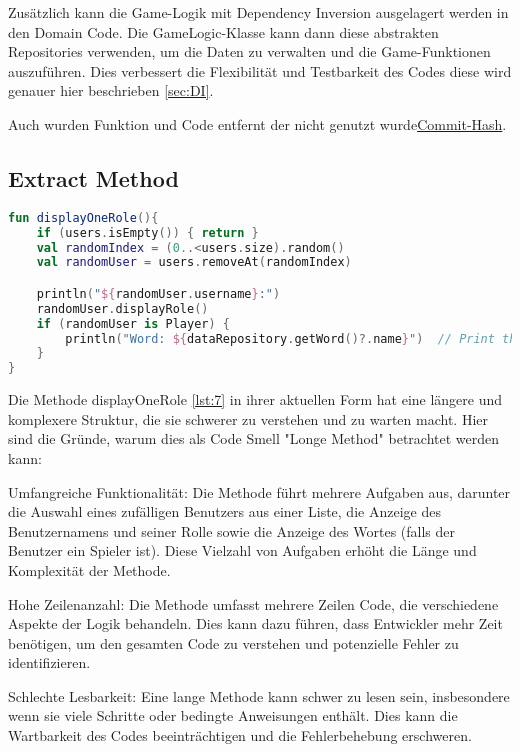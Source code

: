 Zusätzlich kann die Game-Logik mit Dependency Inversion ausgelagert werden in den Domain Code. Die GameLogic-Klasse kann dann diese abstrakten Repositories verwenden, um die Daten zu verwalten und die Game-Funktionen auszuführen. Dies verbessert die Flexibilität und Testbarkeit des Codes diese wird genauer hier beschrieben \ref{sec:DI}.

Auch wurden Funktion und Code entfernt der nicht genutzt wurde\href{https://github.com/lorenz1702/Spy-Game/commit/b6fee0f44df3278afe4a151fb1b4239a373f95bf}{Commit-Hash}.


\subsection{Extract Method}

\begin{lstlisting}[language=Kotlin, caption={Extract Method}, label={lst:7}]
fun displayOneRole(){
    if (users.isEmpty()) { return }
    val randomIndex = (0..<users.size).random()
    val randomUser = users.removeAt(randomIndex)

    println("${randomUser.username}:")
    randomUser.displayRole()
    if (randomUser is Player) {
        println("Word: ${dataRepository.getWord()?.name}")  // Print the word if the user is a player and not a spy
    }
}
\end{lstlisting}

Die Methode displayOneRole \ref{lst:7} in ihrer aktuellen Form hat eine längere und komplexere Struktur, die sie schwerer zu verstehen und zu warten macht. Hier sind die Gründe, warum dies als Code Smell "Longe Method" betrachtet werden kann:

    Umfangreiche Funktionalität: Die Methode führt mehrere Aufgaben aus, darunter die Auswahl eines zufälligen Benutzers aus einer Liste, die Anzeige des Benutzernamens und seiner Rolle sowie die Anzeige des Wortes (falls der Benutzer ein Spieler ist). Diese Vielzahl von Aufgaben erhöht die Länge und Komplexität der Methode.

    Hohe Zeilenanzahl: Die Methode umfasst mehrere Zeilen Code, die verschiedene Aspekte der Logik behandeln. Dies kann dazu führen, dass Entwickler mehr Zeit benötigen, um den gesamten Code zu verstehen und potenzielle Fehler zu identifizieren.

    Schlechte Lesbarkeit: Eine lange Methode kann schwer zu lesen sein, insbesondere wenn sie viele Schritte oder bedingte Anweisungen enthält. Dies kann die Wartbarkeit des Codes beeinträchtigen und die Fehlerbehebung erschweren.

